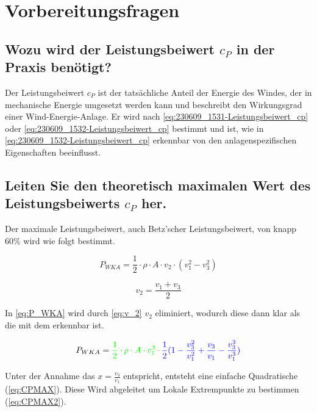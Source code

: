 \section{Vorbereitungsfragen}
\subsection{Wozu wird der Leistungsbeiwert \texorpdfstring{$c_P$}{} in der Praxis benötigt?}
Der Leistungsbeiwert $c_P$ ist der tatsächliche Anteil der Energie des Windes, der in mechanische Energie umgesetzt werden kann und beschreibt den Wirkungsgrad einer Wind-Energie-Anlage. Er wird nach \autoref{eq:230609_1531-Leistungsbeiwert_cp} oder \autoref{eq:230609_1532-Leistungsbeiwert_cp} bestimmt und ist, wie in \ref{eq:230609_1532-Leistungsbeiwert_cp} erkennbar von den anlagenspezifischen Eigenschaften beeinflusst.



\subsection{Leiten Sie den theoretisch maximalen Wert des Leistungsbeiwerts \texorpdfstring{$c_P$}{} her.}
Der maximale Leistungsbeiwert, auch Betz'scher Leistungsbeiwert, von knapp 60\% wird wie folgt bestimmt.

\begin{equation}
P_{WKA}= \frac{1}{2} \cdot \rho \cdot A \cdot v_2 \cdot (v_1^2 - v_3^2)
\label{eq:P_WKA} 
\end{equation}

\begin{equation}
v_2= \frac{v_1+v_3}{2} 
\label{eq:v_2} 
\end{equation}

In \ref{eq:P_WKA} wird durch \ref{eq:v_2} $v_2$ eliminiert, wodurch diese dann klar als die \color{green}{Leistung des Windes}\color{black}{} mit dem \color{blue}{Leistungsbeiwert} \color{black}{}erkennbar ist. 

\begin{equation}
P_{WKA}= \color{green}{\frac{1}{2} \cdot \rho \cdot A \cdot v_1^3 } \cdot \color{blue}{\frac{1}{2} (1-\frac{v_3^2}{v_1^2} + \frac{v_3}{v_1} - \frac{v_3^3}{v_1^3}})\color{black}{}
\label{eq:P_WKA2} 
\end{equation}



Unter der Annahme das $x=\frac{v_3}{v_1}$ entspricht, entsteht eine einfache Quadratische (\autoref{eq:CPMAX}). Diese Wird abgeleitet um Lokale Extrempunkte zu bestimmen (\autoref{eq:CPMAX2}). 

